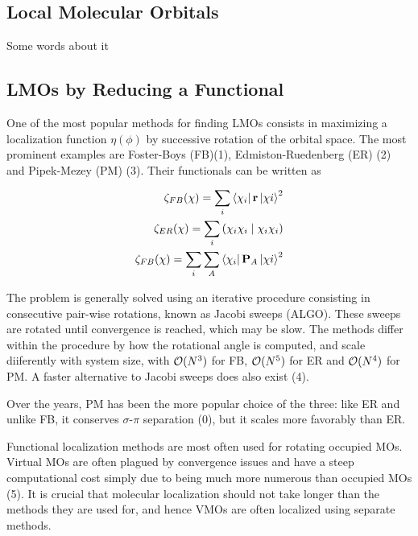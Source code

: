 \subsection{Local Molecular Orbitals}

Some words about it

\subsection{LMOs by Reducing a Functional}

One of the most popular methods for finding LMOs consists in maximizing a localization function $\eta(\phi)$ by successive rotation of the orbital space. The most prominent examples are Foster-Boys (FB)(1), Edmiston-Ruedenberg (ER) (2) and Pipek-Mezey (PM) (3). Their functionals can be written as

\begin{eqnarray}
\zeta_{FB}(\chi) = \sum_i \bra{\chi_i} \mathbf{r} \ket{\chi i}^2 \\
\zeta_{ER}(\chi) = \sum_i \left( \chi_i \chi_i \mid \chi_i \chi_i \right) \\
\zeta_{FB}(\chi) = \sum_i \sum_A \bra{\chi_i} \mathbf{P}_A \ket{\chi i}^2 
\end{eqnarray}

The problem is generally solved using an iterative procedure consisting in consecutive pair-wise rotations, known as Jacobi sweeps (ALGO). These sweeps are rotated until convergence is reached, which may be slow. The methods differ within the procedure by how the rotational angle is computed, and scale diiferently with system size, with $\mathcal{O}(N^{3})$ for FB, $\mathcal{O}(N^{5})$ for ER and $\mathcal{O}(N^{4})$ for PM. A faster alternative to Jacobi sweeps does also exist (4). 

Over the years, PM has been the more popular choice of the three: like ER and unlike FB, it conserves $\sigma$-$\pi$ separation (0),  but it scales more favorably than ER.

Functional localization methods are most often used for rotating occupied MOs. Virtual MOs are often plagued by convergence issues and have a steep computational cost simply due to being much more numerous than occupied MOs (5). It is crucial that molecular localization should not take longer than the methods they are used for, and hence VMOs are often localized using separate methods.

